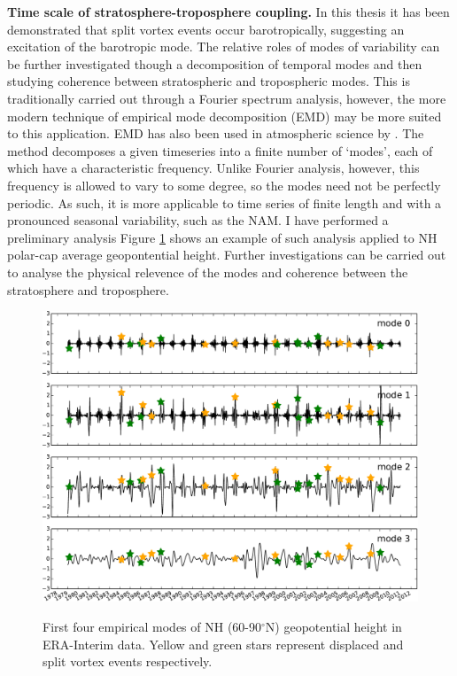 \bigskip\noindent\textbf{Time scale of stratosphere-troposphere coupling.} In
this thesis it has been demonstrated that split vortex events occur
barotropically, suggesting an excitation of the barotropic mode. The relative
roles of modes of variability can be further investigated though a decomposition
of temporal modes and then studying coherence between stratospheric and
tropospheric modes. This is traditionally carried out through a Fourier spectrum
analysis, however, the more modern technique of empirical mode decomposition
(EMD) \citep{Huang1998} may be more suited to this application. EMD has also
been used in atmospheric science by \citet{Coughlin2004}. The method decomposes
a given timeseries into a finite number of `modes', each of which have a
characteristic frequency. Unlike Fourier analysis, however, this frequency is
allowed to vary to some degree, so the modes need not be perfectly periodic. As
such, it is more applicable to time series of finite length and with a
pronounced seasonal variability, such as the NAM. I have performed a preliminary
analysis Figure \ref{fig:emd} shows an example of such analysis applied to NH
polar-cap average geopontential height. Further investigations can be carried
out to analyse the physical relevence of the modes and coherence between the
stratosphere and troposphere.

\begin{figure}[t]
  \centering
  \noindent\includegraphics[width=\textwidth,angle=0]{figures/chapter-conclusions/EMD.pdf}\\
  \caption[EMD timeseries]{First four empirical modes of NH (60-90$^{\circ}$N)
    geopotential height in ERA-Interim data. Yellow and green stars represent
    displaced and split vortex events respectively.}\label{fig:emd}
\end{figure}


